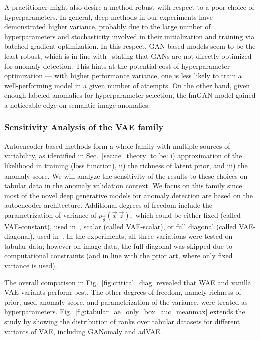 A practitioner might also desire a method robust with respect to a poor choice of hyperparameters.  In general, deep methods in our experiments have demonstrated higher variance, probably due to the large number of hyperparameters and stochasticity involved in their initialization and training via batched gradient optimization. In this respect, GAN-based models seem to be the least robust, which is in line with~\cite{deecke2018image} stating that GANs are not directly optimized for anomaly detection. This hints at the potential cost of hyperparameter optimization --- with higher performance variance, one is less likely to train a well-performing model in a given number of attempts. On the other hand, given enough labeled anomalies for hyperparameter selection, the fmGAN model gained a noticeable edge on semantic image anomalies. 

\subsubsection{Sensitivity Analysis of the VAE family}
\label{sec:vae_results}
Autoencoder-based methods form a whole family with multiple sources of variability, as identified in Sec.~\ref{sec:ae_theory} to be: i) approximation of the likelihood in training (loss function), ii) the richness of latent prior, and iii) the anomaly score. We will analyze the sensitivity of the results to these choices on tabular data in the anomaly validation context. We focus on this family since most of the novel deep generative models for anomaly detection are based on the autoencoder architecture. Additional degrees of freedom include the parametrization of variance of $p_{\vec{\theta}}(\vec{x}|\vec{z}),$ which could be either fixed (called VAE-constant), used in~\cite{yaoUnsupervisedAnomalyDetection2019, wang2020advae, ahnDeepGenerativeModelsBased2020}, scalar (called VAE-scalar), or full diagonal (called VAE-diagonal), used in~\cite{an2015variational,xu2018unsupervised, zenatiEfficientGANBasedAnomaly2018}. In the experiments, all three variations were tested on tabular data; however on image data, the full diagonal was skipped due to computational constraints (and in line with the prior art, where only fixed variance is used).

The overall comparison in Fig.~\ref{fig:critical_diag} revealed that WAE and vanilla VAE variants perform best. The other degrees of freedom, namely richness of prior, used anomaly score, and parametrization of the variance, were treated as hyperparameters. Fig.~\ref{fig:tabular_ae_only_box_auc_meanmax} extends the study by showing the distribution of ranks over tabular datasets for different variants of VAE, including GANomaly and adVAE.

